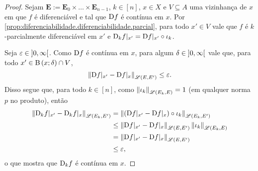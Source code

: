 \begin{proof}
Sejam $\bm E := \bm E_0 \times \ldots \times \bm E_{n-1}$, $k \in [n]$, $x \in X$ e $V \subseteq A$ uma vizinhança de $x$ em que $f$ é diferenciável e tal que $\mathrm{D} f$ é contínua em $x$. Por \ref{prop:diferenciabilidade.diferenciabilidade.parcial}, para todo $x' \in V$ vale que $f$ é $k$-parcialmente diferenciável em $x'$ e $\mathrm{D}_k f|_{x'} = \mathrm{D} f|_{x'} \circ \iota_k$.

Seja $\varepsilon \in \left]0,\allowbreak \infty\right[$. Como $\mathrm{D} f$ é contínua em $x$, para algum $\delta \in \left]0,\allowbreak \infty\right[$ vale que, para todo $x' \in \mathrm{B}\left(x; \delta\right) \cap V$,
	\begin{equation*}
	\left\Vert{\mathrm{D}f|_{x'} - \mathrm{D}f|_x}\right\Vert_{\mathscr{L}(E,E')} \leq \varepsilon.
	\end{equation*}
Disso segue que, para todo $k \in [n]$, como $\left\Vert{\iota_k}\right\Vert_{\mathscr{L}(E_k,E)} = 1$ (em qualquer norma $p$ no produto), então
	\begin{align*}
	\left\Vert{\mathrm{D}_k f|_{x'} - \mathrm{D}_k f|_x}\right\Vert_{\mathscr{L}(E_k,E')} &= \left\Vert{(\mathrm{D}f|_{x'} - \mathrm{D}f|_x) \circ \iota_k}\right\Vert_{\mathscr{L}(E_k,E')} \\
		&\leq \left\Vert{\mathrm{D}f|_{x'} - \mathrm{D}f|_x}\right\Vert_{\mathscr{L}(E,E')}\left\Vert{\iota_k}\right\Vert_{\mathscr{L}(E_k,E)} \\
		&= \left\Vert{\mathrm{D}f|_{x'} - \mathrm{D}f|_x}\right\Vert_{\mathscr{L}(E,E')} \\
		& \leq \varepsilon,
	\end{align*}
o que mostra que $\mathrm{D}_k f$ é contínua em $x$.
\end{proof}

